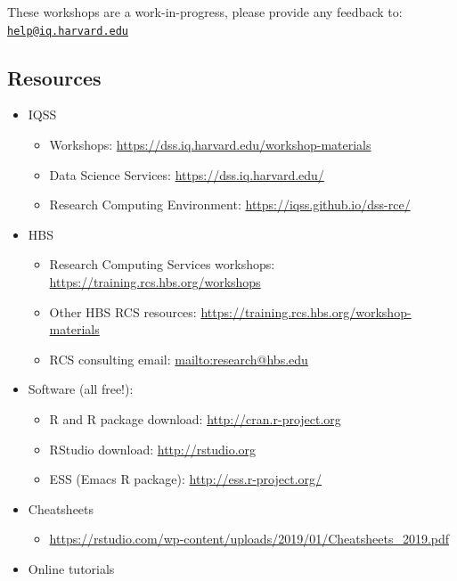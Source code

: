 \documentclass[
]{book}
\providecommand{\tightlist}{%
  \setlength{\itemsep}{0pt}\setlength{\parskip}{0pt}}
\begin{document}
These workshops are a work-in-progress, please provide any feedback to: \href{mailto:help@iq.harvard.edu}{\nolinkurl{help@iq.harvard.edu}}

\hypertarget{resources-2}{%
\subsection{Resources}\label{resources-2}}

\begin{itemize}
\tightlist
\item
  IQSS

  \begin{itemize}
  \tightlist
  \item
    Workshops: \url{https://dss.iq.harvard.edu/workshop-materials}
  \item
    Data Science Services: \url{https://dss.iq.harvard.edu/}
  \item
    Research Computing Environment: \url{https://iqss.github.io/dss-rce/}
  \end{itemize}
\item
  HBS

  \begin{itemize}
  \tightlist
  \item
    Research Computing Services workshops: \url{https://training.rcs.hbs.org/workshops}
  \item
    Other HBS RCS resources: \url{https://training.rcs.hbs.org/workshop-materials}
  \item
    RCS consulting email: \url{mailto:research@hbs.edu}
  \end{itemize}
\item
  Software (all free!):

  \begin{itemize}
  \tightlist
  \item
    R and R package download: \url{http://cran.r-project.org}
  \item
    RStudio download: \url{http://rstudio.org}
  \item
    ESS (Emacs R package): \url{http://ess.r-project.org/}
  \end{itemize}
\item
  Cheatsheets

  \begin{itemize}
  \tightlist
  \item
    \url{https://rstudio.com/wp-content/uploads/2019/01/Cheatsheets_2019.pdf}
  \end{itemize}
\item
  Online tutorials


\end{itemize}
\end{document}
